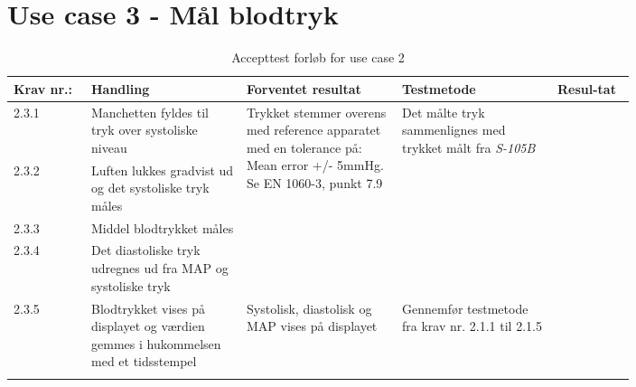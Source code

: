 \section{Use case 3 - Mål blodtryk}
				\begin{longtable}{|p{0.1\linewidth}|p{0.2\linewidth}|p{0.2\linewidth}|p{0.2\linewidth}|p{0.1\linewidth}|}
					\hline
					\rowcolor{usDef}
					Krav nr.: & Handling & Forventet resultat & Testmetode & Resul-tat  \\\hline
					2.3.1 & Manchetten fyldes til tryk over systoliske niveau &  \multirow{4}{\linewidth}{Trykket stemmer overens med reference apparatet med en tolerance på: Mean error +/- 5mmHg. Se EN 1060-3, punkt 7.9} &\multirow{4}{\linewidth}{Det målte tryk sammenlignes med trykket målt fra \textit{S-105B}} & \multirow{4}{\linewidth}{}  \\ \cline{1-2}
					2.3.2 & Luften lukkes gradvist ud og det systoliske tryk måles &  &  &   \\ \cline{1-2} 
					2.3.3 & Middel blodtrykket måles & & & \\ \cline{1-2} 
					2.3.4 &  Det diastoliske tryk udregnes ud fra MAP og systoliske tryk  & & & \\ \hline
					2.3.5 & Blodtrykket vises på displayet og værdien gemmes i hukommelsen med et tidsstempel & Systolisk, diastolisk og MAP vises på displayet & Gennemfør testmetode fra krav nr. 2.1.1 til 2.1.5 & \\ \hline
					\caption{Accepttest forløb for use case 2}
				\end{longtable}
